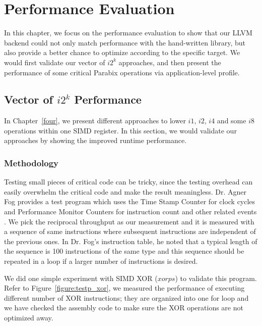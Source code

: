%
%

\chapter{Performance Evaluation}
\label{six}

In this chapter, we focus on the performance evaluation to show that our LLVM backend could not only match performance with the hand-written library, but also provide a better chance to optimize according to the specific target. We would first validate our vector of $i2^k$ approaches, and then present the performance of some critical Parabix operations via application-level profile.

\section{Vector of $i2^k$ Performance}
In Chapter~\ref{four}, we present different approaches to lower $i1$, $i2$, $i4$ and some $i8$ operations within one SIMD register. In this section, we would validate our approaches by showing the improved runtime performance.

\subsection{Methodology}

Testing small pieces of critical code can be tricky, since the testing overhead can easily overwhelm the critical code and make the result meaningless. Dr. Agner Fog provides a test program which uses the Time Stamp Counter for clock cycles and Performance Monitor Counters for instruction count and other related events \cite{agner_testp}. We pick the reciprocal throughput as our measurement and it is measured with a sequence of same instructions where subsequent instructions are independent of the previous ones. In Dr. Fog's instruction table, he noted that a typical length of the sequence is 100 instructions of the same type and this sequence should be repeated in a loop if a larger number of instructions is desired.

We did one simple experiment with SIMD XOR ($xorps$) to validate this program. Refer to Figure~\ref{figure:testp_xor}, we measured the performance of executing different number of XOR instructions; they are organized into one for loop and we have checked the assembly code to make sure the XOR operations are not optimized away.

